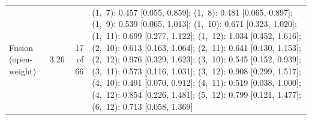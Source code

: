 \begin{table}[htbp]
\begin{tabular}{lrrl}
  Fusion (open-weight) & 3.26 & 17 of 66 & \parbox[t]{0.56\textwidth}{(1,~7): 0.457 [0.055, 0.859]; (1,~8): 0.481 [0.065, 0.897]; (1,~9): 0.539 [0.065, 1.013]; (1,~10): 0.671 [0.323, 1.020]; (1,~11): 0.699 [0.277, 1.122]; (1,~12): 1.034 [0.452, 1.616]; (2,~10): 0.613 [0.163, 1.064]; (2,~11): 0.641 [0.130, 1.153]; (2,~12): 0.976 [0.329, 1.623]; (3,~10): 0.545 [0.152, 0.939]; (3,~11): 0.573 [0.116, 1.031]; (3,~12): 0.908 [0.299, 1.517]; (4,~10): 0.491 [0.070, 0.912]; (4,~11): 0.519 [0.038, 1.000]; (4,~12): 0.854 [0.226, 1.481]; (5,~12): 0.799 [0.121, 1.477]; (6,~12): 0.713 [0.058, 1.369]} \\
\bottomrule
\end{tabular}
\end{table}
